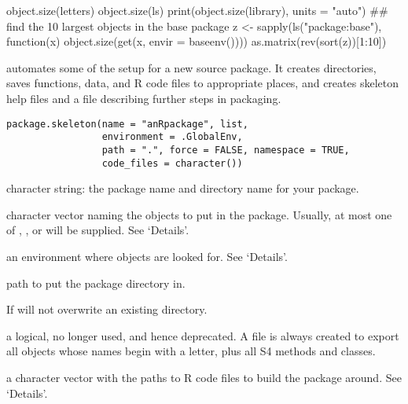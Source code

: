 %
\begin{Examples}
\begin{ExampleCode}
object.size(letters)
object.size(ls)
print(object.size(library), units = "auto")
## find the 10 largest objects in the base package
z <- sapply(ls("package:base"), function(x)
            object.size(get(x, envir = baseenv())))
as.matrix(rev(sort(z))[1:10])
\end{ExampleCode}
\end{Examples}
%
\begin{Description}\relax
{} automates some of the setup for a new source
package.  It creates directories, saves functions, data, and R code files to
appropriate places, and creates skeleton help files and a
 file describing further steps in packaging.
\end{Description}
%
\begin{Usage}
\begin{verbatim}
package.skeleton(name = "anRpackage", list,
                 environment = .GlobalEnv,
                 path = ".", force = FALSE, namespace = TRUE,
                 code_files = character())
\end{verbatim}
\end{Usage}
%
\begin{Arguments}
\begin{ldescription}
\item[\code{name}] character string: the package name and directory name for
your package.
\item[\code{list}] character vector naming the \R{} objects to put in the
package.  Usually, at most one of , ,
or  will be supplied.  See `Details'.
\item[\code{environment}] an environment where objects are looked for.  See
`Details'.
\item[\code{path}] path to put the package directory in.
\item[\code{force}] If  will not overwrite an existing directory.
\item[\code{namespace}] a logical, no longer used, and hence deprecated.  A
 file is always created to export all objects whose
names begin with a letter, plus all S4 methods and classes.
\item[\code{code\_files}] a character vector with the paths to R code files to
build the package around.  See `Details'.
\end{ldescription}
\end{Arguments}
